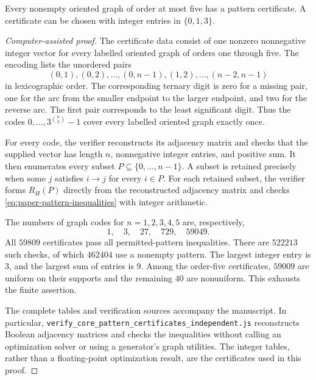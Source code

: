\begin{lemma}
\label{lem:paper-exact-five-certificates}
Every nonempty oriented graph of order at most five has a pattern
certificate. A certificate can be chosen with integer entries in
$\{0,1,3\}$.
\end{lemma}
\begin{proof}[Computer-assisted proof]
The certificate data consist of one nonzero nonnegative integer vector
for every labelled oriented graph of orders one through five. The
encoding lists the unordered pairs
\[
 (0,1),(0,2),\ldots,(0,n-1),(1,2),\ldots,(n-2,n-1)
\]
in lexicographic order. The corresponding ternary digit is zero for a
missing pair, one for the arc from the smaller endpoint to the larger
endpoint, and two for the reverse arc. The first pair corresponds to
the least significant digit. Thus the codes
$0,\ldots,3^{\binom n2}-1$ cover every labelled oriented graph exactly
once.

For every code, the verifier reconstructs its adjacency matrix and checks
that the supplied vector has length $n$, nonnegative integer entries, and
positive sum. It then enumerates every subset $P\subseteq\{0,\ldots,n-1\}$.
A subset is retained precisely when some $j$ satisfies $i\to j$ for
every $i\in P$. For each retained subset, the verifier forms
$R_H(P)$ directly from the reconstructed adjacency matrix and checks
\eqref{eq:paper-pattern-inequalities} with integer arithmetic.

The numbers of graph codes for $n=1,2,3,4,5$ are, respectively,
\[
 1,\quad3,\quad27,\quad729,\quad59049.
\]
All $59809$ certificates pass all permitted-pattern inequalities. There
are $522213$ such checks, of which $462404$ use a nonempty pattern.
The largest integer entry is $3$, and the largest sum of entries is $9$.
Among the order-five certificates, $59009$ are uniform on their supports
and the remaining $40$ are nonuniform. This exhausts the finite assertion.

The complete tables and verification sources accompany the manuscript.
In particular, \texttt{verify\_core\_pattern\_certificates\_independent.js}
reconstructs Boolean adjacency matrices and checks the inequalities
without calling an optimization solver or using a generator's graph
utilities. The integer tables, rather than a floating-point optimization
result, are the certificates used in this proof.
\end{proof}

